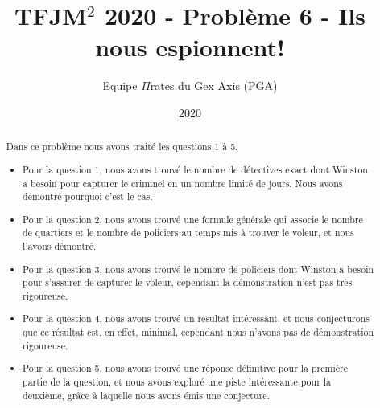 

\title{TFJM$^2$ 2020 - Problème 6 - Ils nous espionnent!}
\author{Equipe $\Pi$rates du Gex Axis (PGA)}
\date{2020}
\setlength{\parindent}{0pt}


\maketitle

\vspace{2cm}

\begin{abstract}
\noindent Dans ce problème nous avons traité les questions 1 à 5. 

\medskip
\begin{itemize}
\item Pour la question 1, nous avons trouvé le nombre de détectives exact dont Winston a besoin pour capturer le criminel en un nombre limité de jours. Nous avons démontré pourquoi c'est le cas.


\item Pour la question 2, nous avons trouvé une formule générale qui associe le nombre de quartiers et le nombre de policiers au temps mis à trouver le voleur, et nous l'avons démontré.

\item Pour la question 3, nous avons trouvé le nombre de policiers dont Winston a besoin pour s'assurer de capturer le voleur, cependant la démonstration n'est pas très rigoureuse.

\item Pour la question 4, nous avons trouvé un résultat intéressant, et nous conjecturons que ce résultat est, en effet, minimal, cependant nous n'avons pas de démonstration rigoureuse.

\item Pour la question 5, nous avons trouvé une réponse définitive pour la première partie de la question, et nous avons exploré une piste intéressante pour la deuxième, grâce à laquelle nous avons émis une conjecture.

\end{itemize}




\clearpage



\end{abstract}
